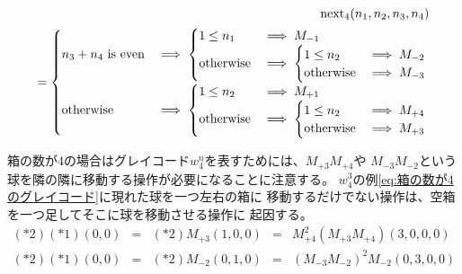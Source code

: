 	\begin{equation*}\begin{split} %
		\myop{next}_4(n_1,n_2,n_3,n_4) \\
		= \begin{cases} n_3+n_4\text{ is even} &\implies \begin{cases}
				1\le n_1 &\implies M_{-1} \\
				\text{otherwise} &\implies \begin{cases}
					1\le n_2 &\implies M_{-2} \\
					\text{otherwise} &\implies M_{-3}
				\end{cases} \\
			\end{cases} \\
			\text{otherwise} &\implies \begin{cases}
				1\le n_2 &\implies M_{+1} \\
				\text{otherwise} &\implies \begin{cases}
					1\le n_2 &\implies M_{+4} \\
					\text{otherwise} &\implies M_{+3}
				\end{cases} \\
			\end{cases} \\
		\end{cases}
	\end{split}\end{equation*} %

	箱の数が$4$の場合はグレイコード$w_4^n$を表すためには、$M_{+3}M_{+4}$や
	$M_{-3}M_{-2}$という球を隣の隣に移動する操作が必要になることに注意する。
	$w_4^3$の例\eqref{eq:箱の数が4のグレイコード}に現れた球を一つ左右の箱に
	移動するだけでない操作は、空箱を一つ足してそこに球を移動させる操作に
	起因する。
	\begin{equation*}\begin{array}{ccccc} %
		(*2)(*1)(0,0) &=& (*2)M_{+3}(1,0,0) 
			&=& M_{+4}^2(M_{+3}M_{+4})(3,0,0,0) \\
		(*2)(*1)(0,0) &=& (*2)M_{-2}(0,1,0) 
			&=& (M_{-3}M_{-2})^2M_{-2}(0,3,0,0) \\
	\end{array}\end{equation*} %

